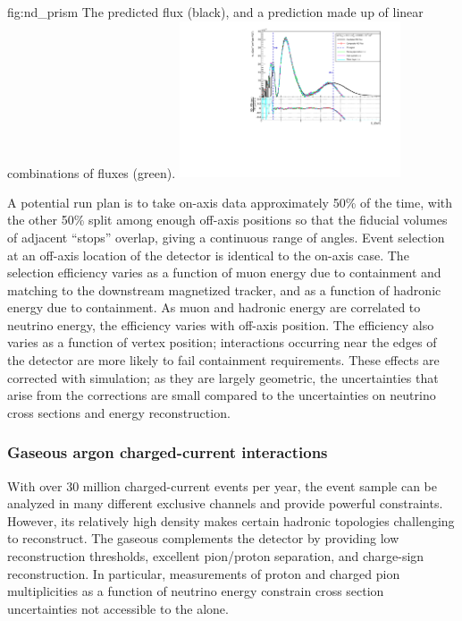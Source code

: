 \begin{dunefigure}{fig:nd_prism}
{The predicted  flux (black), and a prediction made up of linear combinations of  fluxes (green).}
 \includegraphics[width=0.49\textwidth]{graphics/nuprism_coef_oscSpectrum_0_0022_0_5.pdf}
\end{dunefigure}

A potential run plan is to take on-axis data approximately 50\% of the time, with the other 50\% split among enough off-axis positions so that the fiducial volumes of adjacent ``stops'' overlap, giving a continuous range of angles. Event selection at an off-axis location of the  detector is identical to the on-axis case. The selection efficiency varies as a function of muon energy due to containment and matching to the downstream magnetized tracker, and as a function of hadronic energy due to containment. As muon and hadronic energy are correlated to neutrino energy, the efficiency varies with off-axis position. The efficiency also varies as a function of vertex position; interactions occurring near the edges of the detector are more likely to fail containment requirements. These effects are corrected with simulation; as they are largely geometric, the uncertainties that arise from the corrections are small compared to the uncertainties on neutrino cross sections and energy reconstruction. %

\subsubsection{Gaseous argon charged-current interactions}

With over 30 million charged-current events per year, the  event sample can be analyzed in many different exclusive channels and provide powerful constraints. However, its relatively high density makes certain hadronic topologies challenging to reconstruct. The gaseous  complements the  detector by providing low reconstruction thresholds, excellent pion/proton separation, and charge-sign reconstruction. In particular, measurements of proton and charged pion multiplicities as a function of neutrino energy constrain cross section uncertainties not accessible to the  alone.

